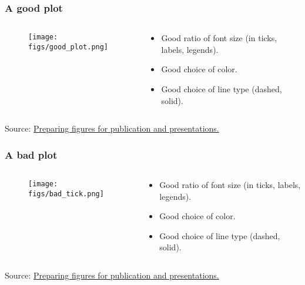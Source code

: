 \documentclass[hyperref={pdfpagelayout=SinglePage}]{beamer}
\def\tcb{\color{blue}}
\begin{document}
\begin{frame}[fragile]
\frametitle{A good plot}

\begin{columns}

    \begin{column}{0.5\textwidth}
    \begin{figure}
        \texttt{[image: figs/good\_plot.png]}
    \end{figure}
    \end{column}
    \begin{column}{0.4\textwidth}
    \begin{itemize}
        \item Good ratio of font size (in ticks, labels, legends).
        \item Good choice of color.
        \item Good choice of line type (dashed, solid).
    \end{itemize}

    \end{column}
\end{columns}
Source: \href{http://www.mrl.ucsb.edu/~seshadri/PreparingFigures.pdf}{\tcb Preparing figures for publication and presentations.}
\end{frame}

\begin{frame}[fragile]
\frametitle{A bad plot}

\begin{columns}

    \begin{column}{0.5\textwidth}
    \begin{figure}
        \texttt{[image: figs/bad\_tick.png]}
    \end{figure}
    \end{column}
    \begin{column}{0.4\textwidth}
    \begin{itemize}
        \item Good ratio of font size (in ticks, labels, legends).
        \item Good choice of color.
        \item Good choice of line type (dashed, solid).
    \end{itemize}

    \end{column}
\end{columns}
Source: \href{http://www.mrl.ucsb.edu/~seshadri/PreparingFigures.pdf}{\tcb Preparing figures for publication and presentations.}
\end{frame}
\end{document}
